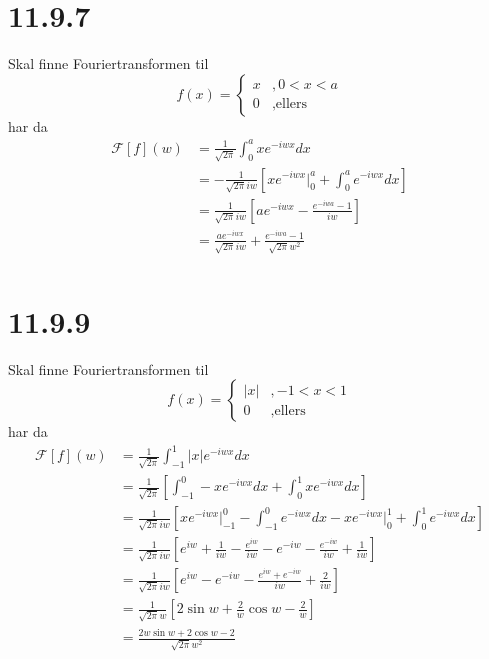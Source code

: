 \documentclass{report}
\newcommand{\bbrack}[1]{\left[ #1 \right]}
\newcommand{\fft}[1]{\mathcal{F} \bbrack{ #1 } (w)}
\begin{document}
\section*{11.9.7}
Skal finne Fouriertransformen til
\begin{equation}
  \label{eq:29}
  f(x) = \left\lbrace
    \begin{array}{ll}
      x & , 0 < x < a \\
      0 & , \text{ellers}
    \end{array} \right.
\end{equation}
har da
\begin{equation}
  \label{eq:30}
  \begin{split}
    \fft{f} &= \frac{1}{\sqrt{2\pi}} \int_{0}^{a} xe^{-iwx} dx \\
            &= -\frac{1}{\sqrt{2\pi} iw} \bbrack{ xe^{-iwx} \Big|_{0}^{a} + \int_{0}^{a} e^{-iwx} dx } \\
            &= \frac{1}{\sqrt{2\pi} iw} \bbrack{ ae^{-iwx} - \frac{e^{-iwa}-1}{iw} } \\
            &= \frac{ae^{-iwx}}{\sqrt{2\pi}iw} + \frac{e^{-iwa} - 1}{\sqrt{2\pi}w^{2}} \\
  \end{split}
\end{equation}



\section*{11.9.9}
Skal finne Fouriertransformen til
\begin{equation}
  \label{eq:31}
  f(x) = \left\lbrace
    \begin{array}{ll}
      |x| & , -1 < x < 1 \\
      0 & , \text{ellers}
    \end{array} \right.
\end{equation}
har da
\begin{equation}
  \label{eq:32}
  \begin{split}
    \fft{f} &= \frac{1}{\sqrt{2\pi}} \int_{-1}^{1} |x|e^{-iwx} dx \\
            &= \frac{1}{\sqrt{2\pi}} \bbrack{ \int_{-1}^{0} -xe^{-iwx} dx + \int_{0}^{1} xe^{-iwx} dx } \\
            &= \frac{1}{\sqrt{2\pi} iw} \bbrack{ xe^{-iwx} \Big|_{-1}^{0} - \int_{-1}^{0} e^{-iwx} dx - xe^{-iwx} \Big|_{0}^{1} + \int_{0}^{1} e^{-iwx}dx } \\
            &= \frac{1}{\sqrt{2\pi}iw} \bbrack{ e^{iw} + \frac{1}{iw} - \frac{e^{iw}}{iw} - e^{-iw} - \frac{e^{-iw}}{iw} + \frac{1}{iw} } \\
            &= \frac{1}{\sqrt{2\pi} iw} \bbrack{ e^{iw} - e^{-iw} - \frac{e^{iw} + e^{-iw}}{iw} + \frac{2}{iw} } \\
            &= \frac{1}{\sqrt{2\pi}w} \bbrack{ 2\sin w + \frac{2}{w} \cos w - \frac{2}{w} } \\
            &= \frac{2w\sin w + 2\cos w - 2}{\sqrt{2\pi} w^{2}}
  \end{split}
\end{equation}
\end{document}
